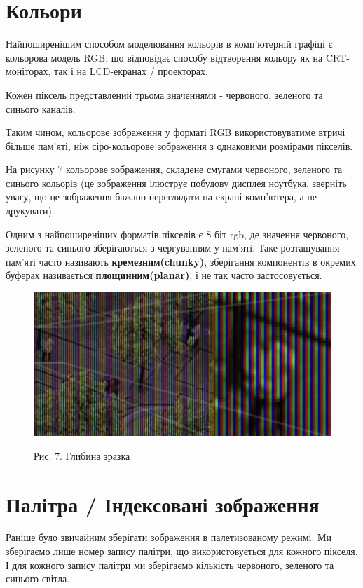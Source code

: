 \documentclass[a4paper,12pt]{article}
\begin{document}
    \section{Кольори}\label{sec:color}
    Найпоширенішим способом моделювання кольорів в комп'ютерній графіці є кольорова модель RGB, що відповідає способу відтворення кольору як на CRT-моніторах, так і на LCD-екранах / проекторах.

    Кожен піксель представлений трьома значеннями - червоного, зеленого та синього каналів.

    Таким чином, кольорове зображення у форматі RGB використовуватиме втричі більше пам'яті, ніж сіро-кольорове зображення з однаковими розмірами пікселів.

    На рисунку 7 кольорове зображення, складене смугами червоного, зеленого та синього кольорів (це зображення ілюструє побудову дисплея ноутбука, зверніть увагу, що це зображення бажано переглядати на екрані комп'ютера, а не друкувати).

    Одним з найпоширеніших форматів пікселів є 8 біт rgb, де значення червоного, зеленого та синього зберігаються з чергуванням у пам'яті.
    Таке розташування пам'яті часто називають \textbf{кремезним(chunky)}, зберігання компонентів в окремих буферах називається \textbf{площинним(planar)}, і не так часто застосовується.

    \begin{figure}
        \label{fig:image7}
        \centering
        \includegraphics[scale=0.5]{image7.png}

        Рис. 7. Глибина зразка
    \end{figure}


    \section{Палітра / Індексовані зображення}\label{sec:palette}
    Раніше було звичайним зберігати зображення в палетизованому режимі.
    Ми зберігаємо лише номер запису палітри, що використовується для кожного пікселя.
    І для кожного запису палітри ми зберігаємо кількість червоного, зеленого та синього світла.
\end{document}
